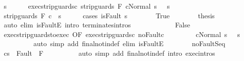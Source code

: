 \begin{isabellebody}
\ s{\isacharprime}\isanewline
\ \ \ \ \isamarkupfalse%
\ exec{\isacharunderscore}strip{\isacharunderscore}guards{\isacharunderscore}c{}{\isacharcolon}\ {\isachardoublequoteopen}{\isasymGamma}{\isasymturnstile}{\isasymlangle}strip{\isacharunderscore}guards\ F\ c{}{\isacharcomma}Normal\ s\ {\isasymrangle}\ {\isasymRightarrow}\ s{\isacharprime}{\isachardoublequoteclose}\isanewline
\ \ \ \ \isamarkupfalse%
\ {\isachardoublequoteopen}{\isasymGamma}{\isasymturnstile}strip{\isacharunderscore}guards\ F\ c{}\ {\isasymdown}\ s{\isacharprime}{\isachardoublequoteclose}\isanewline
\ \ \ \ \isamarkupfalse%
\ {\isacharparenleft}cases\ {\isachardoublequoteopen}isFault\ s{\isacharprime}{\isachardoublequoteclose}{\isacharparenright}\isanewline
\ \ \ \ \ \ \isamarkupfalse%
\ True\isanewline
\ \ \ \ \ \ \isamarkupfalse%
\ {\isacharquery}thesis\ \isamarkupfalse%
\ {\isacharparenleft}auto\ elim{\isacharcolon}\ isFaultE\ intro{\isacharcolon}\ terminates{\isachardot}intros{\isacharparenright}\isanewline
\ \ \ \ \isamarkupfalse%
\isanewline
\ \ \ \ \ \ \isamarkupfalse%
\ False\isanewline
\ \ \ \ \ \ \isamarkupfalse%
\ exec{\isacharunderscore}strip{\isacharunderscore}guards{\isacharunderscore}to{\isacharunderscore}exec\ {\isacharbrackleft}OF\ exec{\isacharunderscore}strip{\isacharunderscore}guards{\isacharunderscore}c{}{\isacharbrackright}\ noFault{\isacharunderscore}c{}\isanewline
\ \ \ \ \ \ \isamarkupfalse%
\ {\isacharasterisk}{\isacharcolon}\ {\isachardoublequoteopen}{\isasymGamma}{\isasymturnstile}{\isasymlangle}c{}{\isacharcomma}Normal\ s\ {\isasymrangle}\ {\isasymRightarrow}\ s{\isacharprime}{\isachardoublequoteclose}\isanewline
\ \ \ \ \ \ \ \ \isamarkupfalse%
\ {\isacharparenleft}auto\ simp\ add{\isacharcolon}\ final{\isacharunderscore}notin{\isacharunderscore}def\ elim{\isacharbang}{\isacharcolon}\ isFaultE{\isacharparenright}\isanewline
\ \ \ \ \ \ \isamarkupfalse%
\ noFault{\isacharunderscore}Seq\ \isamarkupfalse%
\ {\isachardoublequoteopen}{\isasymGamma}{\isasymturnstile}{\isasymlangle}c{}{\isacharcomma}s{\isacharprime}\ {\isasymrangle}\ {\isasymRightarrow}{\isasymnotin}Fault\ {\isacharbackquote}\ F{\isachardoublequoteclose}\isanewline
\ \ \ \ \ \ \ \ \isamarkupfalse%
\ {\isacharparenleft}auto\ simp\ add{\isacharcolon}\ final{\isacharunderscore}notin{\isacharunderscore}def\ intro{\isacharcolon}\ exec{\isachardot}intros{\isacharparenright}\isanewline

\end{isabellebody}
